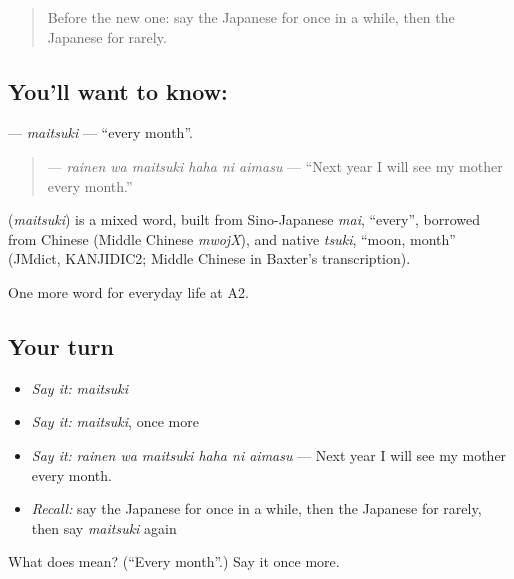\label{lesson:JA-C169-maitsuki}



\begin{quote}
Before the new one: say the Japanese for once in a while, then the Japanese for rarely.
\end{quote}

\subsection*{You'll want to know: }
\textbf{} — \emph{maitsuki} — \textquotedblleft{}every month\textquotedblright{}.

\begin{quote}
\textbf{   } — \emph{rainen wa maitsuki haha ni aimasu} — \textquotedblleft{}Next year I will see my mother every month.\textquotedblright{}
\end{quote}

\begin{cousinweb}
\textbf{} (\emph{maitsuki}) is a mixed word, built from Sino-Japanese \emph{mai}, \textquotedblleft{}every\textquotedblright{}, borrowed from Chinese (Middle Chinese \emph{mwojX}), and native \emph{tsuki}, \textquotedblleft{}moon, month\textquotedblright{} (JMdict, KANJIDIC2; Middle Chinese in Baxter's transcription).
\end{cousinweb}

\begin{grammarlens}[title={What you've built}]
One more word for everyday life at A2.
\end{grammarlens}

\subsection*{Your turn}
\begin{itemize}
\raggedright
  \item \emph{Say it:} \emph{maitsuki}
  \item \emph{Say it:} \emph{maitsuki}, once more
  \item \emph{Say it:} \emph{rainen wa maitsuki haha ni aimasu} — Next year I will see my mother every month.
  \item \emph{Recall:} say the Japanese for once in a while, then the Japanese for rarely, then say \emph{maitsuki} again
\end{itemize}

\begin{tcolorbox}[breakable,colback=teal!4,colframe=teal!35!black,title={Before you move on}]
What does  mean? (\textquotedblleft{}Every month\textquotedblright{}.) Say it once more.
\end{tcolorbox}
